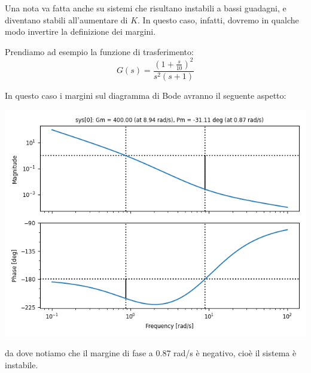 \documentclass[a4paper,11pt]{article}
\begin{document}
\par\medskip

Una nota va fatta anche su sistemi che risultano instabili a bassi guadagni, e diventano stabili all'aumentare di $K$.
In questo caso, infatti, dovremo in qualche modo invertire la definizione dei margini.

Prendiamo ad esempio la funzione di trasferimento:
$$
G(s) = \frac{\left(1 + \frac{s}{10}\right)^2}{s^2 (s + 1)}
$$

\noindent

\begin{minipage}{\textwidth}

In questo caso i margini sul diagramma di Bode avranno il seguente aspetto:
\begin{center}
	\includegraphics[scale=0.75]{../figures/bode_margin_weird.png}
\end{center}

\end{minipage}

da dove notiamo che il margine di fase a $0.87$ rad/s è negativo, cioè il sistema è instabile.
\end{document}
